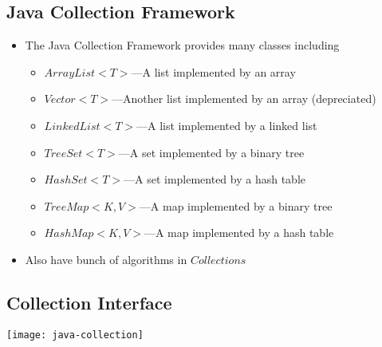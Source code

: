
\begin{slide}
\section{Java Collection Framework}

\begin{PauseHighLight}
  \begin{itemize}
  \item The Java Collection Framework provides many classes including
    \begin{itemize}
    \item \jl$ArrayList<T>$---A list implemented by an array\pause
    \item \jl$Vector<T>$---Another list implemented by an array
      (depreciated)\pause
    \item \jl$LinkedList<T>$---A list implemented by a linked list\pause
    \item \jl$TreeSet<T>$---A set implemented by a binary tree\pause
    \item \jl$HashSet<T>$---A set implemented by a hash table\pause
    \item \jl$TreeMap<K,V>$---A map implemented by a binary tree\pause
    \item \jl$HashMap<K,V>$---A map implemented by a hash table\pause
    \end{itemize}
  \item Also have bunch of algorithms in \jl$Collections$\pause
  \end{itemize}
\end{PauseHighLight}

\end{slide}


\begin{slide}
\section{Collection Interface}

\vspace{-1cm}
\begin{center}
  \texttt{[image: java-collection]}
\end{center}
\vspace{-1cm}
\end{slide}


